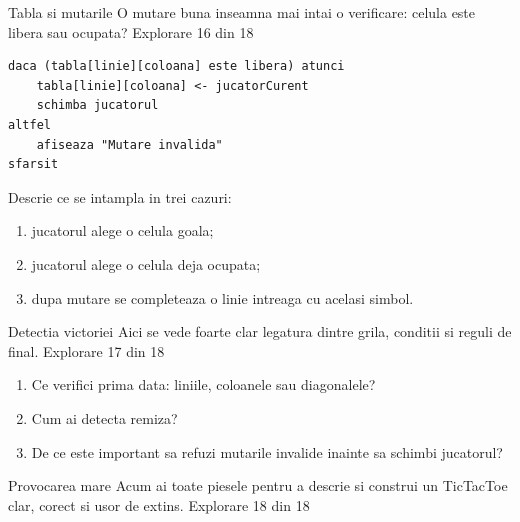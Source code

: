 \clearpage

\PageHeader
  {Tabla si mutarile}
  {O mutare buna inseamna mai intai o verificare: celula este libera sau ocupata?}
  {Explorare 16 din 18}

\begin{examplebox}
\begin{lstlisting}[style=codequest]
daca (tabla[linie][coloana] este libera) atunci
    tabla[linie][coloana] <- jucatorCurent
    schimba jucatorul
altfel
    afiseaza "Mutare invalida"
sfarsit
\end{lstlisting}
\end{examplebox}

\begin{guidebox}[Aplicare]
Descrie ce se intampla in trei cazuri:
\begin{enumerate}
\item jucatorul alege o celula goala;
\item jucatorul alege o celula deja ocupata;
\item dupa mutare se completeaza o linie intreaga cu acelasi simbol.
\end{enumerate}
\end{guidebox}

\clearpage

\PageHeader
  {Detectia victoriei}
  {Aici se vede foarte clar legatura dintre grila, conditii si reguli de final.}
  {Explorare 17 din 18}


\begin{semibox}
\begin{enumerate}
\item Ce verifici prima data: liniile, coloanele sau diagonalele?
\item Cum ai detecta remiza?
\item De ce este important sa refuzi mutarile invalide inainte sa schimbi jucatorul?
\end{enumerate}
\end{semibox}

\clearpage

\PageHeader
  {Provocarea mare}
  {Acum ai toate piesele pentru a descrie si construi un TicTacToe clar, corect si usor de extins.}
  {Explorare 18 din 18}

